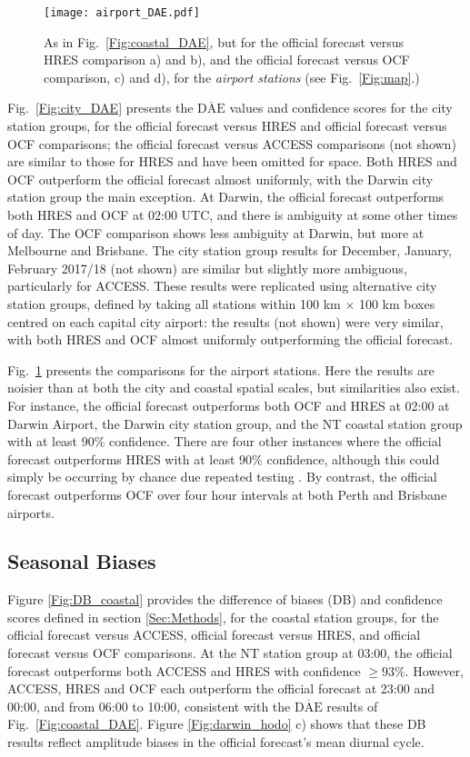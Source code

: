 \documentclass{ametsoc}
\begin{document}
\begin{figure}
\centering
\texttt{[image: airport\_DAE.pdf]}
\caption{As in Fig.~\ref{Fig:coastal_DAE}, but for the official forecast versus HRES comparison a) and b), and the official forecast versus OCF comparison, c) and d), for the \textit{airport stations} (see Fig.~\ref{Fig:map}.)}
\label{Fig:airport_DAE}
\end{figure}

Fig.~\ref{Fig:city_DAE} presents the $\overline{\text{DAE}}$ values and confidence scores for the city station groups, for the official forecast versus HRES and official forecast versus OCF comparisons; the official forecast versus ACCESS comparisons (not shown) are similar to those for HRES and have been omitted for space. Both HRES and OCF outperform the official forecast almost uniformly, with the Darwin city station group the main exception. At Darwin, the official forecast outperforms both HRES and OCF at 02:00 UTC, and there is ambiguity at some other times of day. The OCF comparison shows less ambiguity at Darwin, but more at Melbourne and Brisbane. The city station group results for December, January, February 2017/18 (not shown) are similar but slightly more ambiguous, particularly for ACCESS. These results were replicated using alternative city station groups, defined by taking all stations within 100 km $\times$ 100 km boxes centred on each capital city airport: the results (not shown) were very similar, with both HRES and OCF almost uniformly outperforming the official forecast.

Fig.~\ref{Fig:airport_DAE} presents the comparisons for the airport stations. Here the results are noisier than at both the city and coastal spatial scales, but similarities also exist. For instance, the official forecast outperforms both OCF and HRES at 02:00 at Darwin Airport, the Darwin city station group, and the NT coastal station group with at least $90\%$ confidence. There are four other instances where the official forecast outperforms HRES with at least $90\%$ confidence, although this could simply be occurring by chance due repeated testing \citep[p. 178]{wilks11}. By contrast, the official forecast outperforms OCF over four hour intervals at both Perth and Brisbane airports.

\subsection{Seasonal Biases}
\label{Sec:Seasonal}
Figure \ref{Fig:DB_coastal} provides the difference of biases (DB) and confidence scores defined in section \ref{Sec:Methods}, for the coastal station groups, for the official forecast versus ACCESS, official forecast versus HRES, and official forecast versus OCF comparisons. At the NT station group at 03:00, the official forecast outperforms both ACCESS and HRES with confidence $\geq 93\%$. However, ACCESS, HRES and OCF each outperform the official forecast at 23:00 and 00:00, and from 06:00 to 10:00, consistent with the $\overline{\text{DAE}}$ results of Fig.~\ref{Fig:coastal_DAE}. Figure \ref{Fig:darwin_hodo} c) shows that these DB results reflect amplitude biases in the official forecast's mean diurnal cycle.
\end{document}
